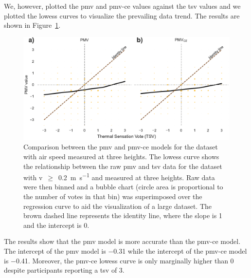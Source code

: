 We, however, plotted the \ac{pmv} and \ac{pmv-ce} values against the \ac{tsv} values and we plotted the \ac{lowess} curves to visualize the prevailing data trend.
The results are shown in Figure~\ref{fig:bubble_models_vs_tsv_three_heights}.
\begin{figure}[htb!]
    \centering
    \includegraphics[width=\textwidth]{figures/bubble_models_vs_tsv_three_heights}
    \caption{Comparison between the \ac{pmv} and \ac{pmv-ce} models for the dataset with air speed measured at three heights. 
    The \ac{lowess} curve shows the relationship between the raw \ac{pmv} and \ac{tsv} data for the dataset with \ac{v}~$\geq$~\qty{0.2}{\m\per\s} and measured at three heights.
    Raw data were then binned and a bubble chart (circle area is proportional to the number of votes in that bin) was superimposed over the regression curve to aid the visualization of a large dataset.
    The brown dashed line represents the identity line, where the slope is 1 and the intercept is 0.}
    \label{fig:bubble_models_vs_tsv_three_heights}
\end{figure}
The results show that the \ac{pmv} model is more accurate than the \ac{pmv-ce} model.
The intercept of the \ac{pmv} model is \num{-.31} while the intercept of the \ac{pmv-ce} model is \num{-.41}.
Moreover, the \ac{pmv-ce} \ac{lowess} curve is only marginally higher than \num{0} despite participants reporting a \ac{tsv} of \num{3}.

